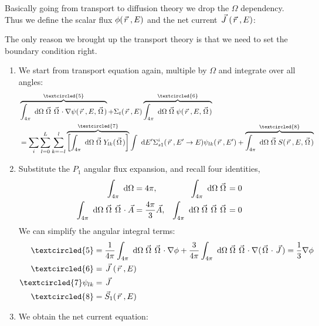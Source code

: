 \documentclass{school-22.211-notes}
\begin{document}
Basically going from transport to diffusion theory we drop the $\Omega$ dependency. Thus we define the scalar flux $\phi(\left.\vec{r}\right., E)$ and the net current $\left.\vec{J}\right. (\left.\vec{r}\right., E)$: 

The only reason we brought up the transport theory is that we need to set the boundary condition right.  




\clearpage
{}
\begin{enumerate}
\item We start from transport equation again, multiple by $\Omega$ and integrate over all angles: 
\begin{align}
& \overbrace{\int_{4\pi} \dOmega \vecOmega \vecOmega \cdot \gradient \psi(\vecr, E, \vecOmega)}^{\textcircled{5}} 
+ \Sigma_t (\vecr, E) \overbrace{\int_{4\pi} \dOmega \vecOmega \psi(\vecr, E, \vecOmega)}^{\textcircled{6}} \\
&= \Sum_i \Sum_{l=0}^L \Sum_{k=-l}^l \overbrace{\left[\int_{4\pi} \dOmega \vecOmega Y_{lk} (\vecOmega) \right]}^{\textcircled{7}} \int \dE' \Sigma_{s1}^i (\vecr, E'\to E) \psi_{lk}(\vecr, E') 
+ \overbrace{\int_{4\pi} \dOmega \vecOmega S(\vecr, E, \vecOmega)}^{\textcircled{8}} 
\end{align}

\item Substitute the $P_1$ angular flux expansion, 
and recall four identities,
\begin{align}
\int_{4\pi} \mbox{ }\mathrm{d} \Omega &= 4 \pi, & \int_{4\pi} \mbox{ }\mathrm{d} \Omega \left.\vec{\Omega}\right. &= 0 \\
\int_{4\pi} \mbox{ }\mathrm{d} \Omega \left.\vec{\Omega}\right. \left.\vec{\Omega}\right. \cdot \vec{A} &= \frac{4\pi}{3} \vec{A}, & \int_{4\pi} \mbox{ }\mathrm{d} \Omega \left.\vec{\Omega}\right. \left.\vec{\Omega}\right. \left.\vec{\Omega}\right. &= 0 
\end{align}
We can simplify the angular integral terms:
\begin{align}
\textcircled{5} &= \frac{1}{4\pi} \int_{4\pi} \dOmega \vecOmega \vecOmega \cdot \gradient \phi + \frac{3}{4\pi} \int_{4\pi} \dOmega \vecOmega \vecOmega \cdot \gradient (\vecOmega \cdot \vecJ) = \frac{1}{3} \gradient \phi \\
\textcircled{6} &= \vecJ (\vecr, E) \\
\textcircled{7} \psi_{lk} &= \vecJ \\
\textcircled{8} &= \vec{S}_1 (\vecr, E) 
\end{align}

\item We obtain the net current equation:
\end{enumerate}
\end{document}
